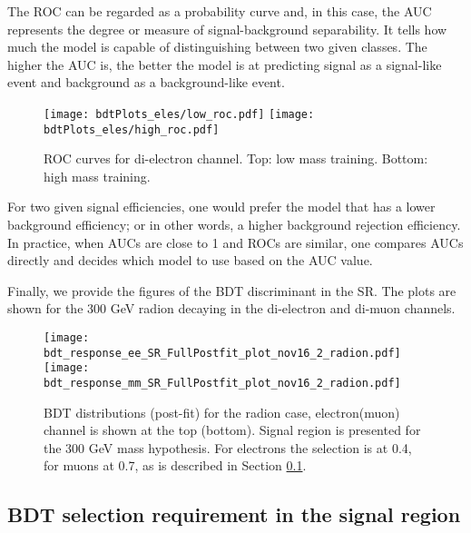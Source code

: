 The ROC can be regarded as a probability curve and, in this case, the AUC represents the degree or measure of signal-background separability. It tells how much the model is capable of distinguishing between two given classes. The higher the AUC is, the better the model is at predicting signal as a signal-like event and background as a background-like event.

\begin{figure}[H]
\begin{center}
\texttt{[image: bdtPlots\_eles/low\_roc.pdf]}
\texttt{[image: bdtPlots\_eles/high\_roc.pdf]}
\caption[ROC curves for di-electron channel.]{ ROC curves for di-electron channel. Top: low mass training. Bottom: high mass training. }
\label{fig:ele_ROCs}
\end{center}
\end{figure}

For two given signal efficiencies, one would prefer the model that has a lower background efficiency; or in other words, a higher background rejection efficiency. In practice, when AUCs are close to 1 and ROCs are similar, one compares AUCs directly and decides which model to use based on the AUC value. 

Finally, we provide the figures of the BDT discriminant in the SR. The plots are shown for the 300 GeV radion decaying in the di-electron and di-muon channels. 

\begin{figure}[H]
\begin{center}
\texttt{[image: bdt\_response\_ee\_SR\_FullPostfit\_plot\_nov16\_2\_radion.pdf]}\\
\texttt{[image: bdt\_response\_mm\_SR\_FullPostfit\_plot\_nov16\_2\_radion.pdf]}\\
\caption[BDT distributions for the radion case.]{ BDT distributions (post-fit) for the radion case, electron(muon) channel is shown at the top (bottom). Signal region is presented for the 300 GeV mass hypothesis. For electrons the selection is at 0.4, for muons at 0.7, as is described in Section \ref{BDT_selection_in_SR}.}
\label{fig:BDTs}
\end{center}
\end{figure}

\subsection{BDT selection requirement in the signal region}
\label{BDT_selection_in_SR}

